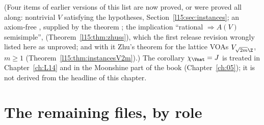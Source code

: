 (Four items of earlier versions of this list are now proved, or were proved all along: nontrivial $V$ satisfying the
hypotheses, Section~\ref{l15:sec:instances}; an axiom-free , supplied by the theorem ; the
implication ``rational $\Rightarrow A(V)$ semisimple'', \allowbreak{}\allowbreak{}
(Theorem~\ref{l15:thm:zhuss}), which the first release revision wrongly listed here as unproved; and with it Zhu's theorem for
the lattice VOAs $V_{\sqrt{2m}\Z}$, $m\ge1$ (Theorem~\ref{l15:thm:instancesV2m}).)
The corollary $\chi_{\Vnat}=J$ is treated in Chapter~\ref{ch:L14} and in the Moonshine part of the book (Chapter~\ref{ch:05});
it is not derived from the headline of this chapter.

\section{The remaining files, by role}\label{l15:sec:files}


